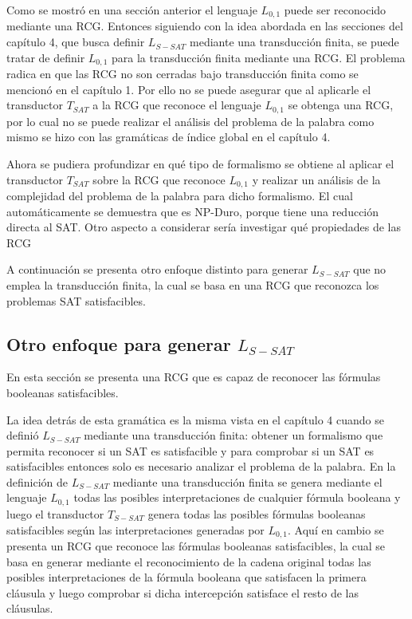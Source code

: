 \documentclass[12pt]{article}
\begin{document}
Como se mostró en una sección anterior el lenguaje $L_{0,1}$ puede ser reconocido mediante una RCG.
Entonces siguiendo con la idea abordada en las secciones del capítulo 4, que busca definir $L_{S-SAT}$
mediante una transducción finita, se puede tratar de definir $L_{0,1}$ para la transducción finita mediante una RCG.
El problema radica en que las RCG no son cerradas bajo transducción finita como se mencionó en el capítulo 1.
Por ello no se puede asegurar que al aplicarle el transductor $T_{SAT}$ a la RCG que reconoce el lenguaje
$L_{0,1}$ se obtenga una RCG, por lo cual no se puede realizar el análisis del problema de la palabra como
mismo se hizo con las gramáticas de índice global en el capítulo 4.

Ahora se pudiera profundizar en qué tipo de formalismo se obtiene al aplicar el transductor $T_{SAT}$
sobre la RCG que reconoce $L_{0,1}$ y realizar un análisis de la complejidad del problema de la palabra
para dicho formalismo. El cual automáticamente se demuestra que es NP-Duro, porque tiene una reducción
directa al SAT. Otro aspecto a considerar sería investigar qué propiedades de las RCG 

A continuación se presenta otro enfoque distinto para generar $L_{S-SAT}$ que no emplea la transducción finita,
la cual se basa en una RCG que reconozca los problemas SAT satisfacibles.

\subsection{Otro enfoque para generar $L_{S-SAT}$}

En esta sección se presenta una RCG que es capaz de reconocer las fórmulas booleanas satisfacibles.

La idea detrás de esta gramática es la misma vista en el capítulo 4 cuando se definió $L_{S-SAT}$ mediante
una transducción finita: obtener un formalismo que permita reconocer si un SAT es satisfacible y para comprobar
si un SAT es satisfacibles entonces solo es necesario analizar el problema de la palabra. En la definición
de $L_{S-SAT}$ mediante una transducción finita se genera mediante el lenguaje $L_{0,1}$ todas las posibles interpretaciones
de cualquier fórmula booleana y luego el transductor $T_{S-SAT}$ genera todas las posibles fórmulas booleanas satisfacibles
según las interpretaciones generadas por $L_{0,1}$. Aquí en cambio se presenta un RCG que reconoce las fórmulas booleanas
satisfacibles, la cual se basa en generar mediante el reconocimiento de la cadena original todas las posibles interpretaciones
de la fórmula booleana que satisfacen la primera cláusula y luego comprobar si dicha intercepción satisface el resto
de las cláusulas.
\end{document}

